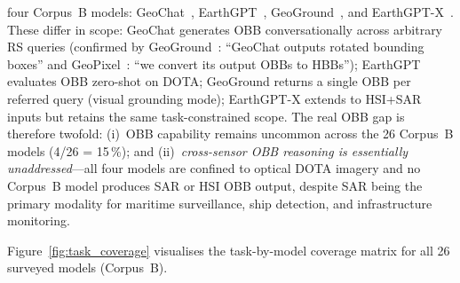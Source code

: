 four Corpus~B models: GeoChat~\cite{geochat2024}, EarthGPT~\cite{earthgpt2025},
GeoGround~\cite{geoground2025}, and EarthGPT-X~\cite{earthgptx2026}. These differ
in scope: GeoChat generates OBB conversationally across arbitrary RS queries
(confirmed by GeoGround~\cite{geoground2025}: ``GeoChat outputs rotated bounding
boxes'' and GeoPixel~\cite{geopixel2025}: ``we convert its output OBBs to HBBs'');
EarthGPT evaluates OBB zero-shot on DOTA; GeoGround returns a single OBB per
referred query (visual grounding mode); EarthGPT-X extends to HSI+SAR inputs
but retains the same task-constrained scope. The real OBB gap is therefore
twofold: (i)~OBB capability remains uncommon across the 26 Corpus~B models
(4/26 = 15\,\%); and (ii)~\emph{cross-sensor OBB reasoning is essentially
unaddressed}---all four models are confined to optical DOTA imagery and no
Corpus~B model produces SAR or HSI OBB output, despite SAR being the primary
modality for maritime surveillance, ship detection, and infrastructure monitoring.

Figure~\ref{fig:task_coverage} visualises the task-by-model coverage matrix
for all 26 surveyed models (Corpus~B).


